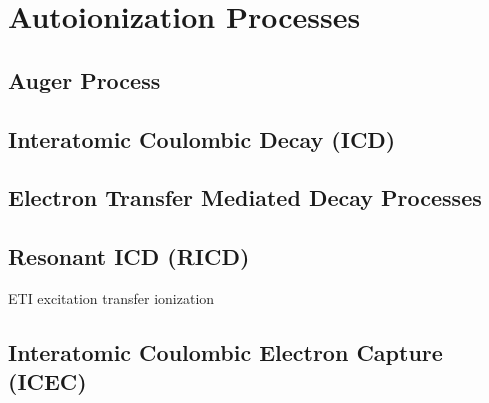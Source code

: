 \section{Autoionization Processes}
\subsection{Auger Process}
\subsection{Interatomic Coulombic Decay (ICD)}
\subsection{Electron Transfer Mediated Decay Processes}
\subsection{Resonant ICD (RICD)}
ETI excitation transfer ionization
\subsection{Interatomic Coulombic Electron Capture (ICEC)}
